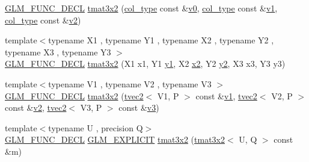 \begin{DoxyCompactItemize}
\mbox{\hyperlink{setup_8hpp_ab2d052de21a70539923e9bcbf6e83a51}{G\+L\+M\+\_\+\+F\+U\+N\+C\+\_\+\+D\+E\+CL}} \mbox{\hyperlink{structglm_1_1tmat3x2_a59846d49680c29a955f14158d32f23b9}{tmat3x2}} (\mbox{\hyperlink{structglm_1_1tmat3x2_a341f5be67463bce97692bc232312b7e8}{col\+\_\+type}} const \&\mbox{\hyperlink{glad_8h_a7062a23d1d434121d4a88f530703d06a}{v0}}, \mbox{\hyperlink{structglm_1_1tmat3x2_a341f5be67463bce97692bc232312b7e8}{col\+\_\+type}} const \&\mbox{\hyperlink{glad_8h_a0779c3b73f9aa3a0ac5b0139b5d291d9}{v1}}, \mbox{\hyperlink{structglm_1_1tmat3x2_a341f5be67463bce97692bc232312b7e8}{col\+\_\+type}} const \&\mbox{\hyperlink{glad_8h_a9a09a1837922b2b806f4589096a52049}{v2}})
\item 
{\footnotesize template$<$typename X1 , typename Y1 , typename X2 , typename Y2 , typename X3 , typename Y3 $>$ }\\\mbox{\hyperlink{setup_8hpp_ab2d052de21a70539923e9bcbf6e83a51}{G\+L\+M\+\_\+\+F\+U\+N\+C\+\_\+\+D\+E\+CL}} \mbox{\hyperlink{structglm_1_1tmat3x2_a11808723576eb33086d64fb1e1ad6105}{tmat3x2}} (X1 x1, Y1 \mbox{\hyperlink{glad_8h_a48340161068d267815ac3131e9d03def}{y1}}, X2 \mbox{\hyperlink{glad_8h_ad2cea6eadb01f017f0d57e7edf0ce988}{x2}}, Y2 \mbox{\hyperlink{glad_8h_af7158b5d27f7a6aa4ab9973fcc3a5c20}{y2}}, X3 x3, Y3 y3)
\item 
{\footnotesize template$<$typename V1 , typename V2 , typename V3 $>$ }\\\mbox{\hyperlink{setup_8hpp_ab2d052de21a70539923e9bcbf6e83a51}{G\+L\+M\+\_\+\+F\+U\+N\+C\+\_\+\+D\+E\+CL}} \mbox{\hyperlink{structglm_1_1tmat3x2_a12d9e62a09e2d082664841f719999405}{tmat3x2}} (\mbox{\hyperlink{structglm_1_1tvec2}{tvec2}}$<$ V1, P $>$ const \&\mbox{\hyperlink{glad_8h_a0779c3b73f9aa3a0ac5b0139b5d291d9}{v1}}, \mbox{\hyperlink{structglm_1_1tvec2}{tvec2}}$<$ V2, P $>$ const \&\mbox{\hyperlink{glad_8h_a9a09a1837922b2b806f4589096a52049}{v2}}, \mbox{\hyperlink{structglm_1_1tvec2}{tvec2}}$<$ V3, P $>$ const \&\mbox{\hyperlink{glad_8h_acc806b31cbf466ceba6555983d8b814d}{v3}})
\item 
{\footnotesize template$<$typename U , precision Q$>$ }\\\mbox{\hyperlink{setup_8hpp_ab2d052de21a70539923e9bcbf6e83a51}{G\+L\+M\+\_\+\+F\+U\+N\+C\+\_\+\+D\+E\+CL}} \mbox{\hyperlink{setup_8hpp_a6c74f5a5e7b134ab69023ff9a30d4d5d}{G\+L\+M\+\_\+\+E\+X\+P\+L\+I\+C\+IT}} \mbox{\hyperlink{structglm_1_1tmat3x2_aca2535c7f0a60d41ce48c7cd0a7f83b9}{tmat3x2}} (\mbox{\hyperlink{structglm_1_1tmat3x2}{tmat3x2}}$<$ U, Q $>$ const \&m)
\item 

\end{DoxyCompactItemize}
